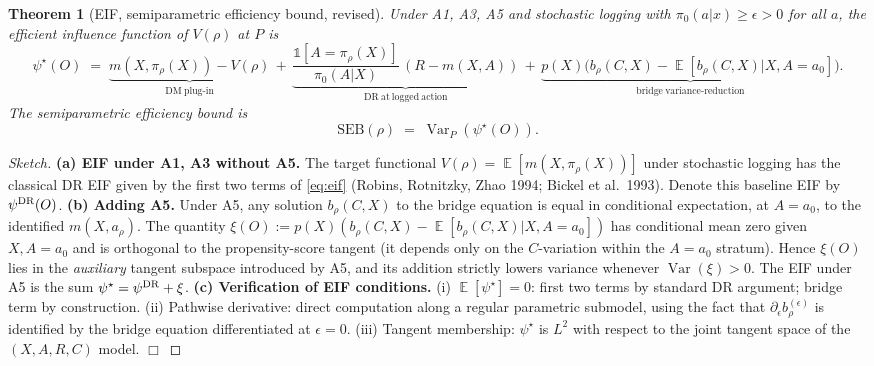 \documentclass[11pt]{article}
\newtheorem{theorem}{Theorem}
\DeclareMathOperator{\E}{\mathbb{E}}
\DeclareMathOperator{\Var}{Var}
\begin{document}
\begin{theorem}[EIF, semiparametric efficiency bound, revised]\label{thm:eif}
Under A1, A3, A5 and stochastic logging with
$\pi_0(a | x) \ge \epsilon > 0$ for all $a$,
the efficient influence function of $V(\rho)$ at $P$ is
\begin{equation}
\psi^\star(O) \;=\;
\underbrace{m(X, \pi_\rho(X)) - V(\rho)}_{\mathrm{DM~plug\mbox{-}in}}
\,+\,
\underbrace{\frac{\mathbb{1}[A = \pi_\rho(X)]}{\pi_0(A | X)}\,(R - m(X, A))}_{\mathrm{DR~at~logged~action}}
\,+\,
\underbrace{p(X)\bigl(b_\rho(C, X) - \E[b_\rho(C, X) | X, A = a_0]\bigr)}_{\mathrm{bridge~variance\mbox{-}reduction}}.
\label{eq:eif}
\end{equation}
The semiparametric efficiency bound is
\begin{equation}
\mathrm{SEB}(\rho) \;=\; \Var_P(\psi^\star(O)).
\label{eq:seb}
\end{equation}
\end{theorem}
\begin{proof}[Sketch]
\textbf{(a) EIF under A1, A3 without A5.}  The target functional
$V(\rho) = \E[m(X, \pi_\rho(X))]$ under stochastic logging has the
classical DR EIF given by the first two terms of \eqref{eq:eif}
(Robins, Rotnitzky, Zhao 1994; Bickel et al.\ 1993).  Denote this
baseline EIF by $\psi^{\rm DR}(O)$.
\textbf{(b) Adding A5.}  Under A5, any solution $b_\rho(C, X)$ to the
bridge equation is equal in conditional expectation, at $A = a_0$,
to the identified $m(X, a_\rho)$.  The quantity
$\xi(O) := p(X)(b_\rho(C, X) - \E[b_\rho(C, X) | X, A = a_0])$
has conditional mean zero given $X, A = a_0$ and is orthogonal to
the propensity-score tangent (it depends only on the $C$-variation
within the $A = a_0$ stratum).  Hence $\xi(O)$ lies in the
\emph{auxiliary} tangent subspace introduced by A5, and its addition
strictly lowers variance whenever $\Var(\xi) > 0$.  The EIF under
A5 is the sum $\psi^\star = \psi^{\rm DR} + \xi$.
\textbf{(c) Verification of EIF conditions.}  (i)
$\E[\psi^\star] = 0$: first two terms by standard DR argument; bridge
term by construction.  (ii) Pathwise derivative: direct computation
along a regular parametric submodel, using the fact that
$\partial_\epsilon b_\rho^{(\epsilon)}$ is identified by the bridge
equation differentiated at $\epsilon = 0$.  (iii) Tangent
membership: $\psi^\star$ is $L^2$ with respect to the joint tangent
space of the $(X, A, R, C)$ model. $\Box$
\end{proof}
\end{document}
